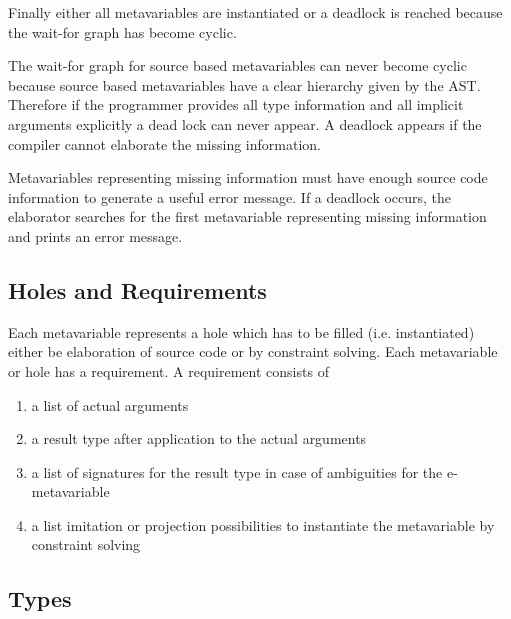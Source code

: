 Finally either all metavariables are instantiated or a deadlock is reached
because the wait-for graph has become cyclic.

The wait-for graph for source based metavariables can never become cyclic
because source based metavariables have a clear hierarchy given by the AST.
Therefore if the programmer provides all type information and all implicit
arguments explicitly a dead lock can never
appear. A deadlock appears if the compiler cannot elaborate the missing
information.

Metavariables representing missing information must have enough source code
information to generate a useful error message. If a deadlock occurs, the
elaborator searches for the first metavariable representing missing
information and prints an error message.






\subsection{Holes and Requirements}

Each metavariable represents a hole which has to be filled (i.e. instantiated)
either be elaboration of source code or by constraint solving. Each metavariable
or hole has a requirement. A requirement consists of
%
\begin{enumerate}
    \item a list of actual arguments

    \item a result type after application to the actual arguments

    \item a list of signatures for the result type in case of ambiguities for
        the e-metavariable

    \item a list imitation or projection possibilities to instantiate the
        metavariable by constraint solving
\end{enumerate}







\subsection{Types}


